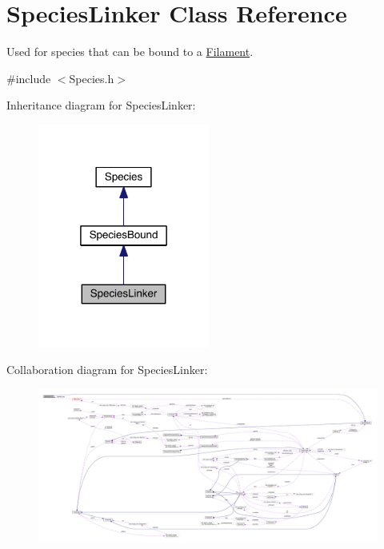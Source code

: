 \hypertarget{classSpeciesLinker}{\section{Species\+Linker Class Reference}
\label{classSpeciesLinker}
}


Used for species that can be bound to a \hyperlink{classFilament}{Filament}.  




{\ttfamily \#include $<$Species.\+h$>$}



Inheritance diagram for Species\+Linker\+:\nopagebreak
\begin{figure}[H]
\begin{center}
\leavevmode
\includegraphics[width=160pt]{classSpeciesLinker__inherit__graph}
\end{center}
\end{figure}


Collaboration diagram for Species\+Linker\+:
\nopagebreak
\begin{figure}[H]
\begin{center}
\leavevmode
\includegraphics[width=350pt]{classSpeciesLinker__coll__graph}
\end{center}
\end{figure}
